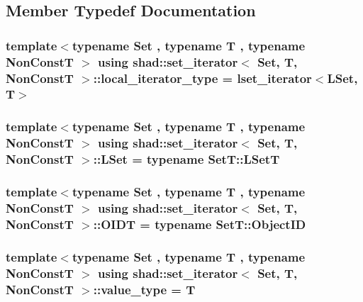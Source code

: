 \subsection{Member Typedef Documentation}
\hypertarget{classshad_1_1set__iterator_a162b1b9d8dfe2e3a656fcdacf0450939}{
\subsubsection[{local\-\_\-iterator\-\_\-type}]{\setlength{\rightskip}{0pt plus 5cm}template$<$typename Set , typename T , typename Non\-Const\-T $>$ using {\bf shad\-::set\-\_\-iterator}$<$ {\bf Set}, T, Non\-Const\-T $>$\-::{\bf local\-\_\-iterator\-\_\-type} =  {\bf lset\-\_\-iterator}$<${\bf L\-Set}, T$>$}}\label{classshad_1_1set__iterator_a162b1b9d8dfe2e3a656fcdacf0450939}
\hypertarget{classshad_1_1set__iterator_a526f8a1656d9a4826cf9d0ec1ab60ac6}{
\subsubsection[{L\-Set}]{\setlength{\rightskip}{0pt plus 5cm}template$<$typename Set , typename T , typename Non\-Const\-T $>$ using {\bf shad\-::set\-\_\-iterator}$<$ {\bf Set}, T, Non\-Const\-T $>$\-::{\bf L\-Set} =  typename Set\-T\-::\-L\-Set\-T}}\label{classshad_1_1set__iterator_a526f8a1656d9a4826cf9d0ec1ab60ac6}
\hypertarget{classshad_1_1set__iterator_a2da49754284fd7ddf591c2df4123b57d}{
\subsubsection[{O\-I\-D\-T}]{\setlength{\rightskip}{0pt plus 5cm}template$<$typename Set , typename T , typename Non\-Const\-T $>$ using {\bf shad\-::set\-\_\-iterator}$<$ {\bf Set}, T, Non\-Const\-T $>$\-::{\bf O\-I\-D\-T} =  typename Set\-T\-::\-Object\-I\-D}}\label{classshad_1_1set__iterator_a2da49754284fd7ddf591c2df4123b57d}
\hypertarget{classshad_1_1set__iterator_aa1c2447817e9c3156a213363f8914b29}{
\subsubsection[{value\-\_\-type}]{\setlength{\rightskip}{0pt plus 5cm}template$<$typename Set , typename T , typename Non\-Const\-T $>$ using {\bf shad\-::set\-\_\-iterator}$<$ {\bf Set}, T, Non\-Const\-T $>$\-::{\bf value\-\_\-type} =  T}}\label{classshad_1_1set__iterator_aa1c2447817e9c3156a213363f8914b29}


